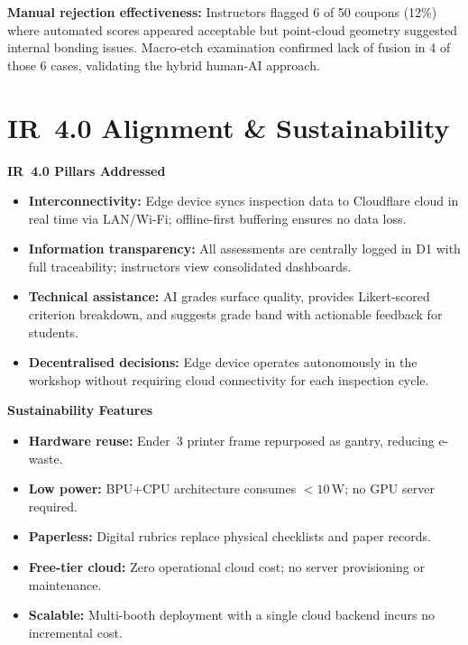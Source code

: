 \documentclass[11pt,a4paper]{article}
\begin{document}
\vspace{6pt}
\noindent\textbf{Manual rejection effectiveness:} Instructors flagged 6 of 50 coupons (12\%) where automated
scores appeared acceptable but point-cloud geometry suggested internal bonding issues. Macro-etch examination
confirmed lack of fusion in 4 of those 6 cases, validating the hybrid human-AI approach.

\section{IR~4.0 Alignment \& Sustainability}

\begin{minipage}[t]{0.48\textwidth}
\textbf{\color{medblue}IR~4.0 Pillars Addressed}
\begin{itemize}[leftmargin=1.2em, itemsep=3pt]
  \item \textbf{Interconnectivity:} Edge device syncs inspection data to Cloudflare cloud in real time via
        LAN/Wi-Fi; offline-first buffering ensures no data loss.
  \item \textbf{Information transparency:} All assessments are centrally logged in D1 with full traceability;
        instructors view consolidated dashboards.
  \item \textbf{Technical assistance:} AI grades surface quality, provides Likert-scored criterion breakdown,
        and suggests grade band with actionable feedback for students.
  \item \textbf{Decentralised decisions:} Edge device operates autonomously in the workshop without requiring
        cloud connectivity for each inspection cycle.
\end{itemize}
\end{minipage}
\hfill
\begin{minipage}[t]{0.48\textwidth}
\textbf{\color{medblue}Sustainability Features}
\begin{itemize}[leftmargin=1.2em, itemsep=3pt]
  \item \textbf{Hardware reuse:} Ender~3 printer frame repurposed as gantry, reducing e-waste.
  \item \textbf{Low power:} BPU+CPU architecture consumes $<10$\,W; no GPU server required.
  \item \textbf{Paperless:} Digital rubrics replace physical checklists and paper records.
  \item \textbf{Free-tier cloud:} Zero operational cloud cost; no server provisioning or maintenance.
  \item \textbf{Scalable:} Multi-booth deployment with a single cloud backend incurs no incremental cost.
\end{itemize}
\end{minipage}
\end{document}
